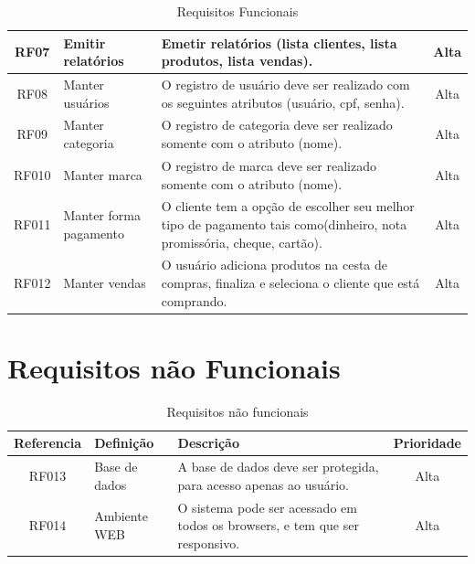 \documentclass[chapter=TITLE,12pt,oneside,a4paper,english,french,sumario=tradicional,spanish,brazil,]{abntex2}
\begin{document}
\begin{table}[!htpb]
\begin{center}
\begin{tabularx}{\textwidth}{|c|p{3cm}|X|c|}
        \hline
        RF07 &
         Emitir relatórios &
        Emetir relatórios (lista clientes, lista produtos, lista vendas).&
        Alta \\

        \hline
        RF08 &
        Manter usuários &
        O registro de usuário deve ser realizado com os seguintes atributos (usuário, cpf, senha).&
        Alta \\

        \hline
        RF09 &
        Manter categoria &
        O registro de categoria deve ser realizado somente com o atributo (nome).&
        Alta \\

        \hline
        RF010 &
        Manter marca &
        O registro de marca deve ser realizado somente com o atributo (nome).&
        Alta \\

        \hline
        RF011 &
        Manter forma pagamento &
        O cliente tem a opção de escolher seu melhor tipo de pagamento tais como(dinheiro, nota promissória, cheque, cartão).&
        Alta \\

         \hline
        RF012 &
        Manter vendas &
        O usuário adiciona produtos na cesta de compras, finaliza e seleciona o cliente que está comprando.&
        Alta \\
        \hline
        \end{tabularx}\caption{Requisitos Funcionais}\label{}
    \end{center}
\end{table}


\newpage

\section{Requisitos não Funcionais}
\renewcommand\tabularxcolumn[1]{m{#1}}
\begin{table}[!htpb]
    \begin{center}
        \begin{tabularx}{\textwidth}{|c|p{3cm}|X|c|}
        \rowcolor[gray]{0.9}
        \hline
        Referencia &
        Definição &
        Descrição &
        Prioridade \\

         \hline
        RF013 &
        Base de dados &
        A base de dados deve ser protegida, para acesso apenas ao usuário.&
        Alta \\

         \hline
        RF014 &
        Ambiente WEB &
        O sistema pode ser acessado em todos os browsers, e tem que ser responsivo.&
        Alta \\

        \hline
        \end{tabularx}\caption{Requisitos não funcionais}\label{}
    \end{center}
\end{table}
\end{document}
